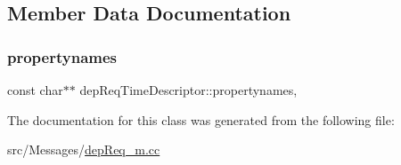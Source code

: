 \subsection{Member Data Documentation}
\mbox{\label{classdepReqTimeDescriptor_a8027018b5fe1aeb72652563cd2a9f505}} 
\subsubsection{\texorpdfstring{propertynames}{propertynames}}
{\footnotesize\ttfamily const char$\ast$$\ast$ dep\+Req\+Time\+Descriptor\+::propertynames\hspace{0.3cm}{\ttfamily [mutable]}, {\ttfamily [private]}}



The documentation for this class was generated from the following file\+:\begin{DoxyCompactItemize}
\item 
src/\+Messages/\hyperlink{depReq__m_8cc}{dep\+Req\+\_\+m.\+cc}\end{DoxyCompactItemize}
